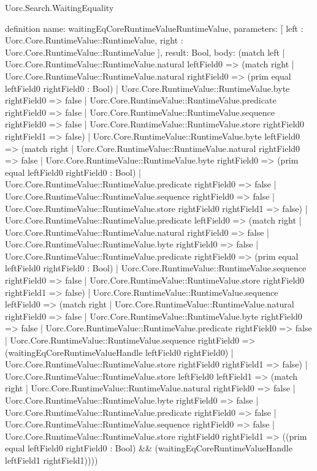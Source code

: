 \begin{lexlean}{Uorc.Search.WaitingEquality}
\begin{semanticmodule}
definition{
  name: waitingEqCoreRuntimeValueRuntimeValue,
  parameters: [
    left : Uorc.Core.RuntimeValue::RuntimeValue,
    right : Uorc.Core.RuntimeValue::RuntimeValue
  ],
  result: Bool,
  body: (match left
    | Uorc.Core.RuntimeValue::RuntimeValue.natural leftField0 => (match right
      | Uorc.Core.RuntimeValue::RuntimeValue.natural rightField0 => (prim equal leftField0 rightField0 : Bool)
      | Uorc.Core.RuntimeValue::RuntimeValue.byte rightField0 => false
      | Uorc.Core.RuntimeValue::RuntimeValue.predicate rightField0 => false
      | Uorc.Core.RuntimeValue::RuntimeValue.sequence rightField0 => false
      | Uorc.Core.RuntimeValue::RuntimeValue.store rightField0 rightField1 => false)
    | Uorc.Core.RuntimeValue::RuntimeValue.byte leftField0 => (match right
      | Uorc.Core.RuntimeValue::RuntimeValue.natural rightField0 => false
      | Uorc.Core.RuntimeValue::RuntimeValue.byte rightField0 => (prim equal leftField0 rightField0 : Bool)
      | Uorc.Core.RuntimeValue::RuntimeValue.predicate rightField0 => false
      | Uorc.Core.RuntimeValue::RuntimeValue.sequence rightField0 => false
      | Uorc.Core.RuntimeValue::RuntimeValue.store rightField0 rightField1 => false)
    | Uorc.Core.RuntimeValue::RuntimeValue.predicate leftField0 => (match right
      | Uorc.Core.RuntimeValue::RuntimeValue.natural rightField0 => false
      | Uorc.Core.RuntimeValue::RuntimeValue.byte rightField0 => false
      | Uorc.Core.RuntimeValue::RuntimeValue.predicate rightField0 => (prim equal leftField0 rightField0 : Bool)
      | Uorc.Core.RuntimeValue::RuntimeValue.sequence rightField0 => false
      | Uorc.Core.RuntimeValue::RuntimeValue.store rightField0 rightField1 => false)
    | Uorc.Core.RuntimeValue::RuntimeValue.sequence leftField0 => (match right
      | Uorc.Core.RuntimeValue::RuntimeValue.natural rightField0 => false
      | Uorc.Core.RuntimeValue::RuntimeValue.byte rightField0 => false
      | Uorc.Core.RuntimeValue::RuntimeValue.predicate rightField0 => false
      | Uorc.Core.RuntimeValue::RuntimeValue.sequence rightField0 => (waitingEqCoreRuntimeValueHandle leftField0 rightField0)
      | Uorc.Core.RuntimeValue::RuntimeValue.store rightField0 rightField1 => false)
    | Uorc.Core.RuntimeValue::RuntimeValue.store leftField0 leftField1 => (match right
      | Uorc.Core.RuntimeValue::RuntimeValue.natural rightField0 => false
      | Uorc.Core.RuntimeValue::RuntimeValue.byte rightField0 => false
      | Uorc.Core.RuntimeValue::RuntimeValue.predicate rightField0 => false
      | Uorc.Core.RuntimeValue::RuntimeValue.sequence rightField0 => false
      | Uorc.Core.RuntimeValue::RuntimeValue.store rightField0 rightField1 => ((prim equal leftField0 rightField0 : Bool) && (waitingEqCoreRuntimeValueHandle leftField1 rightField1))))
}


\end{semanticmodule}
\end{lexlean}
